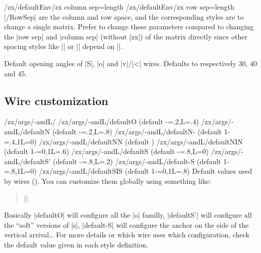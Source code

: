 \documentclass[a4paper,doc2]{ltxdoc} %
\begin{document}
\begin{pgfmanualentry}
  \def\extrakeytext{style, }
  \extractcommand\zxDefaultColumnSep{}\@@
  \extractcommand\zxDefaultRowSep{}\@@
  \makeatletter%
  \extractkey/zx/defaultEnv/zx column sep=length\@nil%
  \extractkey/zx/defaultEnv/zx row sep=length\@nil%
  \makeatother
  \pgfmanualbody
  |\zxDefaultColumn/RowSep| are the column and row space, and the corresponding styles are to change a single matrix. Prefer to change these parameters compared to changing the |row sep| and |column sep| (without |zx|) of the matrix directly since other spacing styles like |\zxZeroCol| or |\zxNCol| depend on |\zxDefaultColumn|.
\end{pgfmanualentry}


\begin{pgfmanualentry}
  \extractcommand\zxDefaultSoftAngleS{}\@@
  \extractcommand\zxDefaultSoftAngleO{}\@@
  \extractcommand\zxDefaultSoftAngleChevron{}\@@
  \pgfmanualbody
  Default opening angles of |S|, |o| and |v|/|<| wires. Defaults to respectively $30$, $40$ and $45$.
\end{pgfmanualentry}

\subsection{Wire customization}\label{subsec:wirecustom}

\begin{pgfmanualentry}
  \makeatletter
  \def\extrakeytext{style, }
  \extractkey/zx/args/-andL/\@nil%
  \extractkey/zx/args/-andL/defaultO (default {-=.2,L=.4})\@nil%
  \extractkey/zx/args/-andL/defaultN (default {-=.2,L=.8})\@nil%
  \extractkey/zx/args/-andL/defaultN- (default {1-=.4,1L=0})\@nil%
  \extractkey/zx/args/-andL/defaultNN (default {})\@nil%
  \extractkey/zx/args/-andL/defaultNIN (default {1-=0,1L=.6})\@nil%
  \extractkey/zx/args/-andL/defaultS (default {-=.8,L=0})\@nil%
  \extractkey/zx/args/-andL/defaultS' (default {-=.8,L=.2})\@nil%
  \extractkey/zx/args/-andL/default-S (default {1-=.8,1L=0})\@nil%
  \extractkey/zx/args/-andL/defaultSIS (default {1-=0,1L=.8})\@nil%
  \makeatother
  \pgfmanualbody
  Default values used by wires (). You can customize them globally using something like:
  \begin{verse}
    ||
   \end{verse}
   Basically |defaultO| will configure all the |o| familly, |defaultS'| will configure all the ``soft'' versions of |s|, |default-S| will configure the anchor on the side of the vertical arrival\dots{} For more details or which wire uses which configuration, check the default value given in each style definition.
\end{pgfmanualentry}
\end{document}

